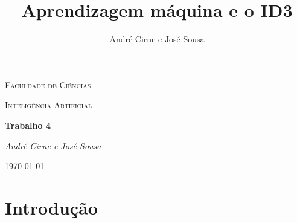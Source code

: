 \documentclass[12pt,a4paper]{article}
\author{André Cirne e José Sousa}
\title{Aprendizagem máquina e o ID3}
\begin{document}
	
\begin{titlepage}
	\centering
	{\scshape\LARGE Faculdade de Ciências \par}
	\vspace{1cm}
	{\scshape\Large Inteligência Artificial\par}
	\vspace{1.5cm}
	{\huge\bfseries Trabalho 4\par}
	\vspace{2cm}
	{\Large\itshape André Cirne e José Sousa\par}
	\vfill
	
	{\large \today\par}
\end{titlepage}

\tableofcontents
\section{Introdução}
\end{document}
